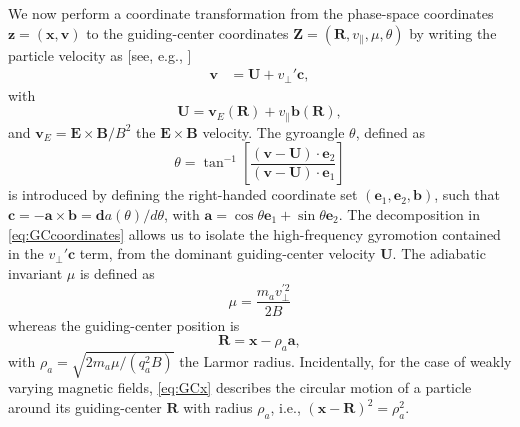 We now perform a coordinate transformation from the phase-space coordinates $\mathbf z = (\mathbf x, \mathbf v)$ to the guiding-center coordinates $\mathbf Z = (\mathbf R, v_\parallel, \mu, \theta)$ by writing the particle velocity as [see, e.g., \citet{Littlejohn1983a}]
%
\begin{align}
    \mathbf v &= \mathbf U+ v_\perp' \mathbf c,
    \label{eq:GCcoordinates}
\end{align}
%
with
%
\begin{equation}
    \mathbf U = \mathbf v_E(\mathbf R) + v_\parallel \mathbf b(\mathbf R),
\end{equation}
%
and $\mathbf v_E = \mathbf E \times \mathbf B/B^2$ the $\mathbf E \times \mathbf B$ velocity. The gyroangle $\theta$, defined as
%
\begin{equation}
    \theta = \tan^{-1} \left[\frac{\left(\mathbf v - \mathbf U \right)\cdot \mathbf e_2}{\left(\mathbf v - \mathbf U \right)\cdot \mathbf e_1} \right]
\end{equation}
%
is introduced by defining the right-handed coordinate set $(\mathbf e_1, \mathbf e_2, \mathbf b)$, such that $\mathbf c = -\mathbf a \times \mathbf b=\mathbf d a(\theta)/d\theta$, with $\mathbf a = \cos \theta \mathbf e_1 + \sin \theta \mathbf e_2$.
The decomposition in \cref{eq:GCcoordinates} allows us to isolate the high-frequency gyromotion contained in the $v_\perp' \mathbf c$ term, from the dominant guiding-center velocity $\mathbf U$.
The adiabatic invariant $\mu$ is defined as
%
\begin{equation}
    \mu = \frac{m_a v_\perp^{'2}}{2B}
\label{eq:gcmu}
\end{equation}
%
whereas the guiding-center position is
%
\begin{equation}
    \mathbf R = \mathbf x - \rho_a \mathbf a,
    \label{eq:GCx}
\end{equation}
%
with $\rho_a = \sqrt{2 m_a  \mu/(q_a^2 B)}$ the Larmor radius. Incidentally, for the case of weakly varying magnetic fields, \cref{eq:GCx} describes the circular motion of a particle around its guiding-center $\mathbf R$ with radius $\rho_a$, i.e., $(\mathbf x - \mathbf R)^2 = \rho_a^2$.

